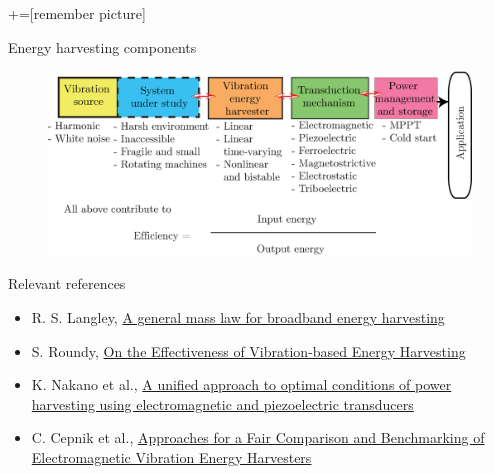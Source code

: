 \documentclass[LaTeX2e,10pt]{beamer}
\newcommand{\footline}{\color{sotonMB}\rule{\textwidth}{1pt}}
\begin{document}
\setbeamertemplate{footline}{
	\vskip-10pt\footline\\ %
	\vskip2pt
	\makebox[123mm]{\hspace{7.5mm}
	\insertshorttitle
	\hfill \insertframenumber}
	\vskip4pt
}
+=[remember picture]
\everymath{\displaystyle}
\begin{frame}{Energy harvesting components}
\begin{figure}
	\centering
	\includegraphics[width=\linewidth]{Images/energyHarvestingComponents.eps}
	\caption{}
\end{figure}
\vskip-20pt
Relevant references
\scriptsize
\begin{itemize}
	\item R. S. Langley, \href{https://www.sciencedirect.com/science/article/pii/S0022460X13007906}{A general mass law for broadband energy harvesting}
	\item S. Roundy, \href{http://journals.sagepub.com/doi/abs/10.1177/1045389X05054042}{On the Effectiveness of Vibration-based Energy Harvesting}
	\item K. Nakano et al., \href{http://iopscience.iop.org/article/10.1088/0964-1726/16/4/002/meta}{A unified approach to optimal conditions of power harvesting using electromagnetic and piezoelectric transducers}
	\item C. Cepnik et al., \href{http://www.mdpi.com/2072-666X/4/3/286}{Approaches for a Fair Comparison and Benchmarking of Electromagnetic Vibration Energy Harvesters}
\end{itemize}
\end{frame}
\end{document}
